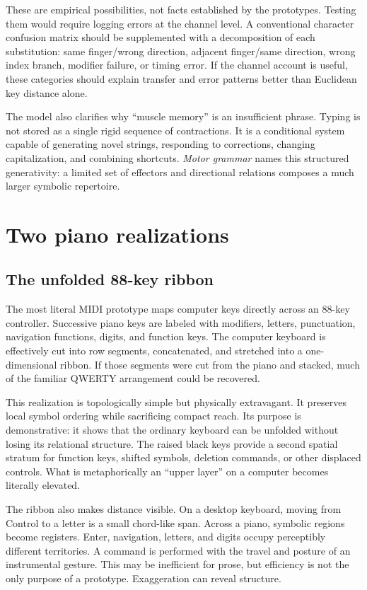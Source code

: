 \documentclass[11pt]{article}
\begin{document}
These are empirical possibilities, not facts established by the prototypes. Testing them would require logging errors at the channel level. A conventional character confusion matrix should be supplemented with a decomposition of each substitution: same finger/wrong direction, adjacent finger/same direction, wrong index branch, modifier failure, or timing error. If the channel account is useful, these categories should explain transfer and error patterns better than Euclidean key distance alone.

The model also clarifies why ``muscle memory'' is an insufficient phrase. Typing is not stored as a single rigid sequence of contractions. It is a conditional system capable of generating novel strings, responding to corrections, changing capitalization, and combining shortcuts. \emph{Motor grammar} names this structured generativity: a limited set of effectors and directional relations composes a much larger symbolic repertoire.

\section{Two piano realizations}

\subsection{The unfolded 88-key ribbon}

The most literal MIDI prototype maps computer keys directly across an 88-key controller. Successive piano keys are labeled with modifiers, letters, punctuation, navigation functions, digits, and function keys. The computer keyboard is effectively cut into row segments, concatenated, and stretched into a one-dimensional ribbon. If those segments were cut from the piano and stacked, much of the familiar QWERTY arrangement could be recovered.

This realization is topologically simple but physically extravagant. It preserves local symbol ordering while sacrificing compact reach. Its purpose is demonstrative: it shows that the ordinary keyboard can be unfolded without losing its relational structure. The raised black keys provide a second spatial stratum for function keys, shifted symbols, deletion commands, or other displaced controls. What is metaphorically an ``upper layer'' on a computer becomes literally elevated.

The ribbon also makes distance visible. On a desktop keyboard, moving from Control to a letter is a small chord-like span. Across a piano, symbolic regions become registers. Enter, navigation, letters, and digits occupy perceptibly different territories. A command is performed with the travel and posture of an instrumental gesture. This may be inefficient for prose, but efficiency is not the only purpose of a prototype. Exaggeration can reveal structure.
\end{document}
